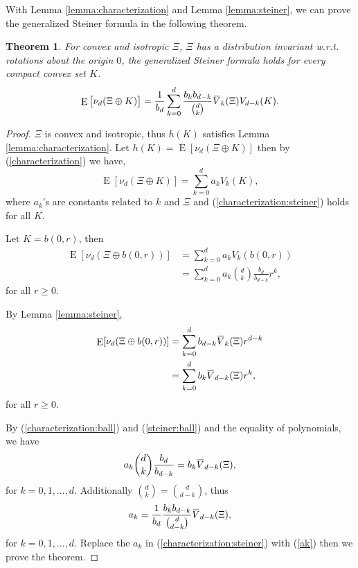 \documentclass[10pt, conference, letterpaper]{IEEEtran}
\newtheorem{theorem}{Theorem}
\DeclareMathOperator*{\E}{\mathrm{E}}
\newcommand{\overbar}[1]{\mkern 1.5mu\overline{\mkern-1.5mu#1\mkern-1.5mu}\mkern 1.5mu}
\begin{document}
With Lemma \ref{lemma:characterization} and Lemma \ref{lemma:steiner}, we can prove the generalized Steiner formula in the following theorem.
\begin{theorem}
	For convex and isotropic $\Xi$, $\Xi$ has a distribution invariant w.r.t. rotations about the origin $0$, the generalized Steiner formula holds for every compact convex set $K$. 
	\begin{equation}
	\E\big[\nu_d(\Xi\oplus K)\big] = \frac{1}{b_d}\sum\limits_{k=0}^{d}\frac{b_k b_{d-k}}{{d \choose k}}\overbar{V}_k(\Xi) V_{d-k}(K).
	\end{equation}
\end{theorem}
\begin{proof}
	$\Xi$ is convex and isotropic, thus $h(K)$ satisfies Lemma \ref{lemma:characterization}. Let $h(K) = \E[\nu_d(\Xi \oplus K)]$ then by (\ref{characterization}) we have, 
	\begin{equation}\label{characterization:steiner}
	\E[\nu_d(\Xi\oplus K)] = \sum\limits_{k=0}^{d}a_kV_k(K),
	\end{equation}
	where $a_k$'s are constants related to $k$ and $\Xi$ and (\ref{characterization:steiner}) holds for all $K$. 
	
	Let $K=b(0, r)$, then 
	\begin{equation}\label{characterization:ball}
	\begin{aligned}
	\E[\nu_d(\Xi\oplus b(0,r))] &= \sum\limits_{k=0}^{d}a_kV_k(b(0,r))\\
	& = \sum\limits_{k=0}^{d} a_k{d \choose k}\frac{b_d}{b_{d-k}}r^k,
	\end{aligned}
	\end{equation}
	for all $r\geq 0$.
	
	By Lemma \ref{lemma:steiner}, 
	\begin{equation}\label{steiner:ball}
	\begin{aligned}
	\E[\nu_d(\Xi\oplus b(0,r))] &= \sum\limits_{k=0}^{d}b_{d-k}\overbar{V}_k(\Xi)r^{d-k}\\
	& = \sum\limits_{k=0}^{d}b_k\overbar{V}_{d-k}(\Xi)r^k,
	\end{aligned}
	\end{equation}
	for all $r\geq 0$.
	
	By (\ref{characterization:ball}) and (\ref{steiner:ball}) and the equality of polynomials, we have 
	\begin{equation*}
	a_k{d \choose k}\frac{b_d}{b_{d-k}} = b_k\overbar{V}_{d-k}(\Xi),
	\end{equation*}
	for $k = 0, 1,\ldots, d$. Additionally ${d\choose k} = {d\choose {d-k}}$, thus
	\begin{equation}\label{ak}
	a_k = \frac{1}{b_d}\frac{b_kb_{d-k}}{{d\choose {d-k}}}\overbar{V}_{d-k}(\Xi),
	\end{equation}
	for $k = 0, 1,\ldots, d$. Replace the $a_k$ in (\ref{characterization:steiner}) with (\ref{ak}) then we prove the theorem.
\end{proof}
\end{document}
